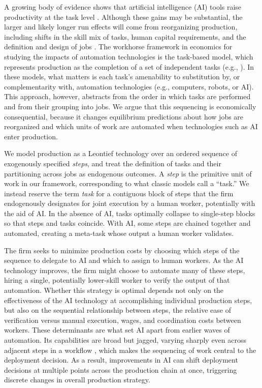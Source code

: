 A growing body of evidence shows that artificial intelligence (AI) tools raise productivity at the task level \citep{noy2023experimental, brynjolfsson2023generative, demirer2026writing}.
Although these gains may be substantial, the larger and likely longer run effects will come from reorganizing production, including shifts in the skill mix of tasks, human capital requirements, and the definition and design of jobs \citep{brynjolfsson2021productivity}.
The workhorse framework in economics for studying the impacts of automation technologies is the task-based model, which represents production as the completion of a set of independent tasks (e.g., \citealp{autor2003skill, acemoglu2011skills, acemoglu2018, acemoglu2019automation, acemoglu2022tasks}).
In these models, what matters is each task's amenability to substitution by, or complementarity with, automation technologies (e.g., computers, robots, or AI).
This approach, however, abstracts from the order in which tasks are performed and from their grouping into jobs.
We argue that this sequencing is economically consequential, because it changes equilibrium predictions about how jobs are reorganized and which units of work are automated when technologies such as AI enter production.

We model production as a Leontief technology over an ordered sequence of exogenously specified \emph{steps}, and treat the definition of tasks and their partitioning across jobs as endogenous outcomes.
A \emph{step} is the primitive unit of work in our framework, corresponding to what classic models call a ``task.''
We instead reserve the term \emph{task} for a contiguous block of steps that the firm endogenously designates for joint execution by a human worker, potentially with the aid of AI.
In the absence of AI, tasks optimally collapse to single-step blocks so that steps and tasks coincide.
With AI, some steps are chained together and automated, creating a meta-task whose output a human worker validates.

The firm seeks to minimize production costs by choosing which steps of the sequence to delegate to AI and which to assign to human workers.
As the AI technology improves, the firm might choose to automate many of these steps, hiring a single, potentially lower-skill worker to verify the output of that automation.
Whether this strategy is optimal depends not only on the effectiveness of the AI technology at accomplishing individual production steps, but also on the sequential relationship between steps, the relative ease of verification versus manual execution, wages, and coordination costs between workers.
These determinants are what set AI apart from earlier waves of automation.
Its capabilities are broad but jagged, varying sharply even across adjacent steps in a workflow \citep{dell2023navigating}, which makes the sequencing of work central to the deployment decision.
As a result, improvements in AI can shift deployment decisions at multiple points across the production chain at once, triggering discrete changes in overall production strategy.

